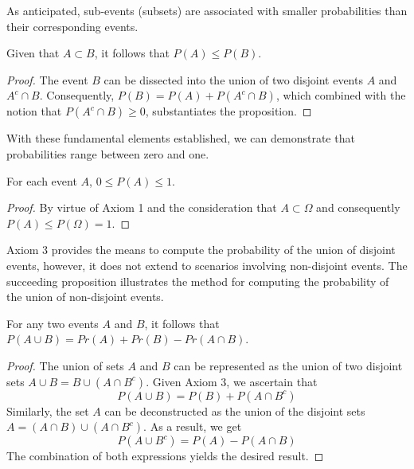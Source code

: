 As anticipated, sub-events (subsets) are associated with smaller probabilities than their corresponding events.

\begin{proposition}
Given that $A\subset B$, it follows that $P \left( A \right) \leq P \left( B \right)$.
\end{proposition}
\begin{proof}
The event $B$ can be dissected into the union of two disjoint events $A$ and $A^c \cap B$. Consequently, $P \left( B \right) = P \left( A \right) + P \left( A^c \cap B \right)$, which combined with the notion that  $P \left( A^c \cap B \right) \geq 0$, substantiates the proposition.
\end{proof}

With these fundamental elements established, we can demonstrate that probabilities range between zero and one.

\begin{proposition}
For each event $A$, $0 \leq P \left( A \right) \leq 1$.
\end{proposition}
\begin{proof}
By virtue of Axiom 1 and the consideration that $A \subset \Omega$ and consequently $P \left( A \right) \leq P \left( \Omega \right) = 1$.
\end{proof}

Axiom 3 provides the means to compute the probability of the union of disjoint events, however, it does not extend to scenarios involving non-disjoint events. The succeeding proposition illustrates the method for computing the probability of the union of non-disjoint events.

\begin{proposition}
For any two events $A$ and $B$, it follows that $P\left(A\cup B\right)=Pr\left(A\right)+Pr\left(B\right)-Pr\left(A\cap B\right)$.
\end{proposition}
\begin{proof}
The union of sets $A$ and $B$ can be represented as the union of two disjoint sets $A \cup B = B \cup \left( A \cap B^c \right)$. Given Axiom 3, we ascertain that
\[
P \left( A \cup B \right) = P \left( B \right) + P \left( A \cap B^c \right)
\]
Similarly, the set $A$ can be deconstructed as the union of the disjoint sets $A = \left( A \cap B \right) \cup \left( A \cap B^c \right)$. As a result, we get
\[
P \left( A \cup B^c \right) = P \left( A \right) - P \left( A \cap B \right)
\]
The combination of both expressions yields the desired result.
\end{proof}

